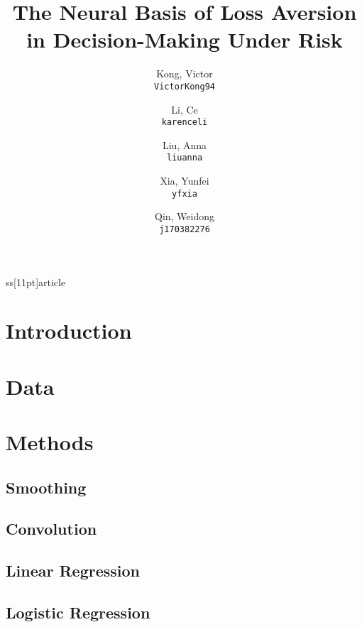 ss[11pt]{article}

\usepackage[margin=0.75in]{geometry}
\usepackage{graphicx}
\usepackage{indentfirst}


\title{The Neural Basis of Loss Aversion in Decision-Making Under Risk}
\author{
  Kong, Victor\\
  \texttt{VictorKong94}
  \and
  Li, Ce\\
  \texttt{karenceli}
  \and
  Liu, Anna\\
  \texttt{liuanna}
  \and
  Xia, Yunfei\\
  \texttt{yfxia}
  \and
  Qin, Weidong\\
  \texttt{j170382276}
}


\maketitle

\abstract{}

\section{Introduction}
        

\section{Data}
        

\section{Methods}

    \subsection{Smoothing}
            
    \subsection{Convolution}
            
    \subsection{Linear Regression}
            
    \subsection{Logistic Regression}
                
